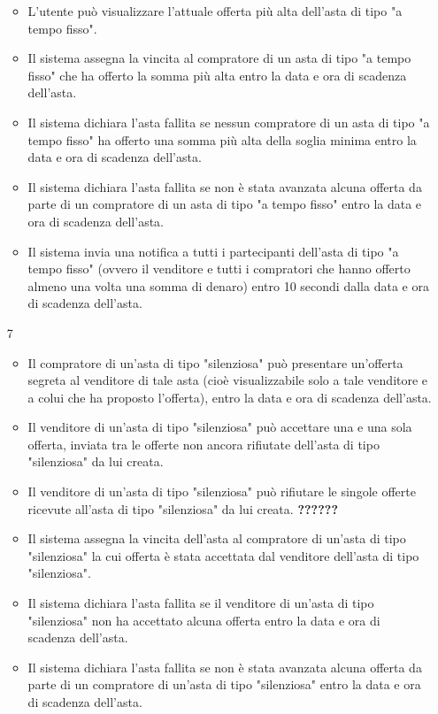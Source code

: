 \begin{itemize}
\begin{itemize}
                    \item L'utente può visualizzare l'attuale offerta più alta dell'asta di tipo "a tempo fisso".
                    \item Il sistema assegna la vincita al compratore di un asta di tipo "a tempo fisso" che ha offerto la somma più alta entro la data e ora di scadenza dell'asta.
                    \item Il sistema dichiara l'asta fallita se nessun compratore di un asta di tipo "a tempo fisso" ha offerto una somma più alta della soglia minima entro la data e ora di scadenza dell'asta.
                    \item Il sistema dichiara l'asta fallita se non è stata avanzata alcuna offerta da parte di un compratore di un asta di tipo "a tempo fisso" entro la data e ora di scadenza dell'asta.
                    \item Il sistema invia una notifica a tutti i partecipanti dell'asta di tipo "a tempo fisso" (ovvero il venditore e tutti i compratori che hanno offerto almeno una volta una somma di denaro) entro 10 secondi dalla data e ora di scadenza dell'asta.
                \end{itemize}
            \item[7] 
                \begin{itemize}
                    \item Il compratore di un'asta di tipo "silenziosa" può presentare un'offerta segreta al venditore di tale asta (cioè visualizzabile solo a tale venditore e a colui che ha proposto l'offerta), entro la data e ora di scadenza dell'asta.
                    \item Il venditore di un'asta di tipo "silenziosa" può accettare una e una sola offerta, inviata tra le offerte non ancora rifiutate dell'asta di tipo "silenziosa" da lui creata.
                    \item Il venditore di un'asta di tipo "silenziosa" può rifiutare le singole offerte ricevute all'asta di tipo "silenziosa" da lui creata. \textbf{??????}
                    \item Il sistema assegna la vincita dell'asta al compratore di un'asta di tipo "silenziosa" la cui offerta è stata accettata dal venditore dell'asta di tipo "silenziosa".
                    \item Il sistema dichiara l'asta fallita se il venditore di un'asta di tipo "silenziosa" non ha accettato alcuna offerta entro la data e ora di scadenza dell'asta.
                    \item Il sistema dichiara l'asta fallita se non è stata avanzata alcuna offerta da parte di un compratore di un'asta di tipo "silenziosa" entro la data e ora di scadenza dell'asta.

\end{itemize}
\end{itemize}
